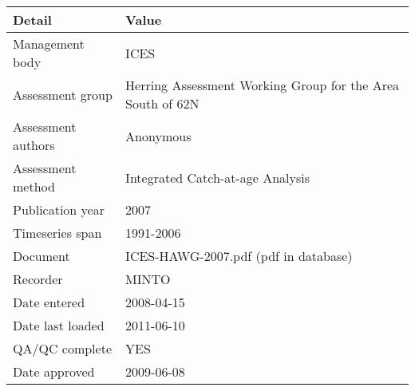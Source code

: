 \begin{table}[htb]
\centering
\begin{tabular}{lp{7cm}}
\toprule
Detail & Value \\
\midrule
Management body    & ICES                                                       \\
Assessment group   & Herring Assessment Working Group for the Area South of 62N \\
Assessment authors & Anonymous                                                  \\
Assessment method  & Integrated Catch-at-age Analysis                           \\
Publication year   & 2007                                                       \\
Timeseries span    & 1991-2006                                                  \\
Document           & ICES-HAWG-2007.pdf (pdf in database)                       \\
Recorder           & MINTO                                                      \\
Date entered       & 2008-04-15                                                 \\
Date last loaded   & 2011-06-10                                                 \\
QA/QC complete     & YES                                                        \\
Date approved      & 2009-06-08                                                 \\
\bottomrule
\end{tabular}
\label{tab:assessdet}
\end{table}
